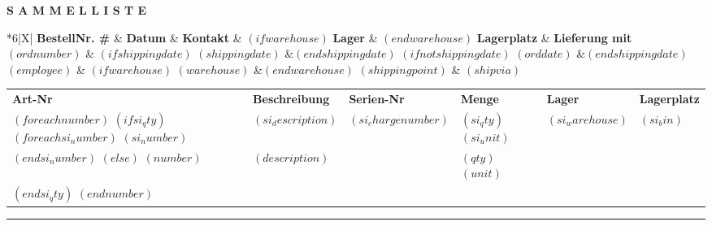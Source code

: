 \documentclass[twoside]{scrartcl}
\begin{document}
\textbf{S A M M E L L I S T E}
\hfill

\vspace{1cm}
\begin{tabularx}{\textwidth}{*{6}{|X}|} \hline
  \textbf{BestellNr. \#} &
  \textbf{Datum} &
  \textbf{Kontakt} &
  $(if warehouse)$ \textbf{Lager} & $(end warehouse)$
  \textbf{Lagerplatz} &
  \textbf{Lieferung mit} \\ [0.5em]
  \hline
	$(ordnumber)$ &
	$(if shippingdate)$ $(shippingdate)$ &$(end shippingdate)$
	$(if not shippingdate)$ $(orddate)$ &$(end shippingdate)$
	$(employee)$ &
	$(if warehouse)$ $(warehouse)$ &$(end warehouse)$
	$(shippingpoint)$ &
	$(shipvia)$ \\
  \hline
\end{tabularx}

\vspace{1cm}

\setlength{\tabcolsep}{0mm}
\begin{tabularx}{\textwidth}{p{1.5cm}p{6cm}p{2cm}p{2cm}p{4cm}p{1.5cm}}
  \textbf{Art-Nr} &
  \textbf{Beschreibung} &
  \textbf{Serien-Nr} &
  \textbf{Menge} &
  \textbf{Lager} &
  \textbf{Lagerplatz} \\
$(foreach number)$
 $(if si_qty)$
  $(foreach si_number)$
   $(si_number)$ &
   $(si_description)$ &
   $(si_chargenumber)$ &
   \hfill $(si_qty)$ $(si_unit)$ &
   $(si_warehouse)$ &
   $(si_bin)$\\[1em]
  $(end si_number)$
 $(else)$
  $(number)$ &
  $(description)$ &
  &
  \hfill $(qty)$ $(unit)$ &
  & \\[1em]
 $(end si_qty)$
$(end number)$
\end{tabularx}

\parbox{\textwidth}{
\rule{\textwidth}{2pt}
}
\end{document}
